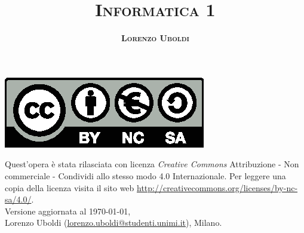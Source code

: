 \documentclass[A4paper, 11pt]{book}
\title{\Huge \bfseries \scshape Informatica 1}
\author{\Large \bfseries \scshape Lorenzo Uboldi}
\date{}
\begin{document}
	\frontmatter
	\maketitle
	
	\null %
	\vfill %
	\hspace*{-1.5em}\includegraphics[scale=.7]{Immagini/by-nc-sa-eu.eps}
	\begin{flushleft}
		Quest'opera è stata rilasciata con licenza \emph{Creative Commons} Attribuzione - Non commerciale - Condividi allo stesso modo 4.0 Internazionale. Per leggere una copia della licenza visita il sito web \url{http://creativecommons.org/licenses/by-nc-sa/4.0/}.\\[1cm]
		Versione aggiornata al \today,\\
		Lorenzo Uboldi (\href{mailto:lorenzo.uboldi@studenti.unimi.it}{\ttfamily lorenzo.uboldi@studenti.unimi.it}), Milano.
	
	\end{flushleft}

	\cleardoublepage
	\tableofcontents %
	
	
	
	\mainmatter
	
	
	
	
	
	
	
	
	
	
	
	
	
	\appendix
	
	
	
%	
	
	
\end{document}
